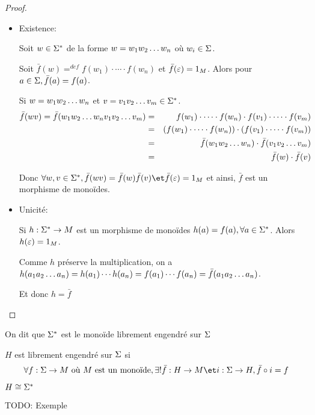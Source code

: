 \begin{proof}
	\begin{itemize}
		\item Existence:

		      Soit $w\in \Sigma^{*}$ de la forme $w = w_1 w_2 \ldots w_{n}$ où $w_i \in \Sigma$.

		      Soit $\bar f (w) =^{def} f(w_1) \cdot \cdots \cdot f(w_n)$ et $\bar f (\varepsilon) = 1_M$. Alors pour $a\in \Sigma, \bar f (a) = f (a)$.

		      Si $w = w_1 w_2 \ldots w_{n}$ et $v = v_1 v_2 \ldots v_{m} \in \Sigma^{*}$.
		      \begin{eqnarray*}
			      \bar f(wv) = \bar f(w_1 w_2 \ldots w_{n} v_1 v_2 \ldots v_{m}) &=& f(w_1) \cdot \cdots \cdot f(w_n) \cdot f(v_1) \cdot \cdots \cdot f(v_m) \\
			      &=& \left( f(w_1) \cdot \cdots \cdot f(w_n)\right)\cdot\left(f(v_1) \cdot \cdots \cdot f(v_m) \right)\\
			      &=& \bar f(w_1 w_2 \ldots w_{n}) \cdot \bar f (v_1 v_2 \ldots v_{m}) \\
			      &=& \bar f(w) \cdot \bar f (v)
		      \end{eqnarray*}

		      Donc $\forall w, v \in \mots, \bar f (wv) = \bar f (w)\bar f(v) \et \bar f (\motvide) = 1_M$ et ainsi, $\bar f$ est un morphisme de monoïdes.


		\item Unicité:

		      Si $h : \Sigma^{*} \to M$ est un morphisme de monoïdes \tq $h(a) = f(a), \forall a \in \Sigma^{*}$. Alors $h(\varepsilon) = 1_M$.

		      Comme $h$ préserve la multiplication, on a
		      $h (a_1 a_2 \ldots a_{n}) = h(a_1) \cdots h(a_n) = f(a_1) \cdots f(a_n) = \bar f (a_1 a_2 \ldots a_{n})$.

		      Et donc $h = \bar f$
	\end{itemize}
\end{proof}

On dit que $\Sigma^{*}$ est le monoïde librement engendré sur $\Sigma$

\begin{definition}
	$H$ est librement engendré sur $\Sigma$ si
	$$\forall f : \alphabet \to M \text{ où } M  \text { est un monoïde}, \exists ! \bar f : H \to M \et i : \alphabet \to H, \bar f \circ i   = f $$

	$ H \cong \Sigma^{*}$
\end{definition}

\begin{exemple}
	TODO: Exemple
\end{exemple}

